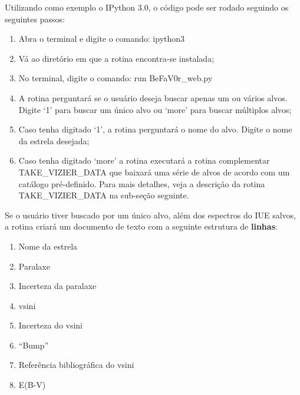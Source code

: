\documentclass[letterpaper,10pt,english]{sphinxmanual}
\begin{document}
Utilizando como exemplo o IPython 3.0, o código pode ser rodado seguindo os seguintes passos:
\begin{enumerate}
\item {} 
Abra o terminal e digite o comando:  ipython3

\item {} 
Vá ao diretório em que a rotina encontra-se instalada;

\item {} 
No terminal, digite o comando:   run BeFaV0r\_web.py

\item {} 
A rotina perguntará se o usuário deseja buscar apenas um ou vários alvos. Digite `1' para buscar um único alvo ou `more' para buscar múltiplos alvos;

\item {} 
Caso tenha digitado `1', a rotina perguntará o nome do alvo. Digite o nome da estrela desejada;

\item {} 
Caso tenha digitado `more' a rotina executará a rotina complementar TAKE\_VIZIER\_DATA que baixará uma série de alvos de acordo com um catálogo pré-definido. Para mais detalhes, veja a descrição da rotina TAKE\_VIZIER\_DATA na sub-seção seguinte.

\end{enumerate}

Se o usuário tiver buscado por um único alvo, além dos espectros do IUE salvos, a rotina criará um documento de texto com a seguinte estrutura de \textbf{linhas}:
\begin{enumerate}
\item {} 
Nome da estrela

\item {} 
Paralaxe

\item {} 
Incerteza da paralaxe

\item {} 
vsini

\item {} 
Incerteza do vsini

\item {} 
``Bump''

\item {} 
Referência bibliográfica do vsini

\item {} 
E(B-V)

\end{enumerate}
\end{document}
